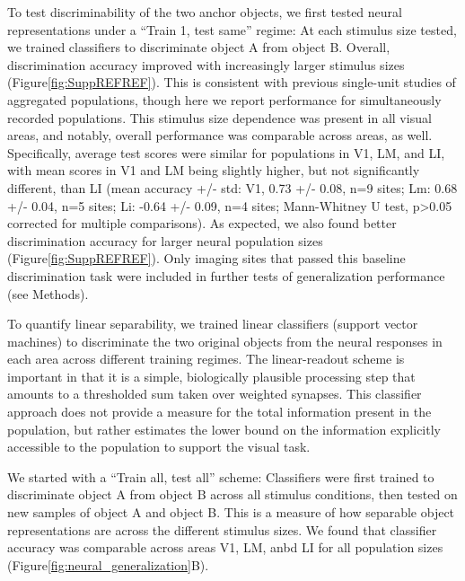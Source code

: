 To test discriminability of the two anchor objects, we first tested neural representations under a “Train 1, test same” regime: At each stimulus size tested, we trained classifiers to discriminate object A from object B. Overall, discrimination accuracy improved with increasingly larger stimulus sizes (Figure\ref{fig:SuppREFREF}). This is consistent with previous single-unit studies of aggregated populations, though here we report performance for simultaneously recorded populations. This stimulus size dependence was present in all visual areas, and notably, overall performance was comparable across areas, as well. Specifically, average test scores were similar for populations in V1, LM, and LI, with mean scores in V1 and LM being slightly higher, but not significantly different, than LI (mean accuracy +/- std: V1, 0.73 +/- 0.08, n=9 sites; Lm: 0.68 +/- 0.04, n=5 sites; Li: -0.64 +/- 0.09, n=4 sites; Mann-Whitney U test, p>0.05 corrected for multiple comparisons). As expected, we also found better discrimination accuracy for larger neural population sizes (Figure\ref{fig:SuppREFREF}). Only imaging sites that passed this baseline discrimination task were included in further tests of generalization performance (see Methods). 

To quantify linear separability, we trained linear classifiers (support vector machines) to discriminate the two original objects from the neural responses in each area across different training regimes. The linear-readout scheme is important in that it is a simple, biologically plausible processing step that amounts to a thresholded sum taken over weighted synapses\cite{REFREF}. This classifier approach does not provide a measure for the total information present in the population, but rather estimates the lower bound on the information explicitly accessible to the population to support the visual task. 

We started with a “Train all, test all” scheme:  Classifiers were first trained to discriminate object A from object B across all stimulus conditions, then tested on new samples of object A and object B. This is a measure of how separable object representations are across the different stimulus sizes. We found that classifier accuracy was comparable across areas V1, LM, anbd LI for all population sizes (Figure\ref{fig:neural_generalization}B). %


